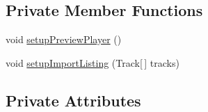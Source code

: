 \subsection*{Private Member Functions}
\begin{DoxyCompactItemize}
\item 
void \hyperlink{classcom_1_1lclion_1_1midigui_1_1_dialog_track_import_ab5f5b7d46d664f092c40a045618402b5}{setup\+Preview\+Player} ()
\item 
void \hyperlink{classcom_1_1lclion_1_1midigui_1_1_dialog_track_import_a8d5ad9e40f8a718ad1a74d164c9c89cd}{setup\+Import\+Listing} (Track\mbox{[}$\,$\mbox{]} tracks)
\end{DoxyCompactItemize}
\subsection*{Private Attributes}
